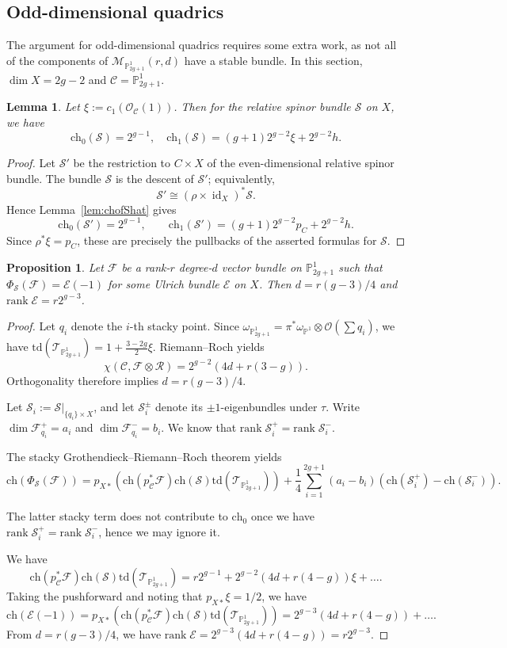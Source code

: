 \documentclass[12pt, letterpaper]{amsart}
\newtheorem{proposition}[theorem]{Proposition}
\newtheorem{lemma}[theorem]{Lemma}
\theoremstyle{definition}
\newcommand{\PP}{\mathbb{P} }
\newcommand{\cC}{\mathcal{C} }
\newcommand{\cE}{\mathcal{E} }
\newcommand{\cF}{\mathcal{F} }
\newcommand{\cM}{\mathcal{M} }
\newcommand{\cO}{\mathcal{O} }
\newcommand{\cR}{\mathcal{R} }
\newcommand{\cS}{\mathcal{S} }
\newcommand{\cT}{\mathcal{T} }
\def\rank{\mathrm{rank}\;}
\def\ch{\mathrm{ch}}
\def\td{\mathrm{td}}
\begin{document}
\subsection{Odd-dimensional quadrics}

The argument for odd-dimensional quadrics requires some extra work, as not all of the components of \(\cM_{\PP_{2g+1}^1}(r, d)\) have a stable bundle. In this section, \(\dim X = 2g - 2\) and \(\cC = \PP_{2g+1}^1\).

\begin{lemma}\label{lem:chofS}
Let \(\xi:=c_1(\cO_{\cC}(1))\). Then for the relative spinor bundle \(\cS\) on \(X\), we have
\[\ch_0(\cS) = 2^{g-1}, \quad \ch_1(\cS) = (g+1)2^{g-2}\xi + 2^{g-2}h.\]
\end{lemma}

\begin{proof}
Let \(\cS'\) be the restriction to \(C\times X\) of the even-dimensional relative spinor bundle. The bundle \(\cS\) is the descent of \(\cS'\); equivalently,
\[\cS'\cong(\rho\times\operatorname{id}_X)^*\cS.\]
Hence Lemma~\ref{lem:chofShat} gives
\[\ch_0(\cS')=2^{g-1},\qquad\ch_1(\cS')=(g+1)2^{g-2}p_C+2^{g-2}h.\]
Since \(\rho^*\xi=p_C\), these are precisely the pullbacks of the asserted formulas for \(\cS\).
\end{proof}

\begin{proposition}\label{prop:Ulrichrankodd}
Let \(\cF\) be a rank-\(r\) degree-\(d\) vector bundle on \(\PP_{2g+1}^1\) such that \(\Phi_{\cS}(\cF) = \cE(-1)\) for some Ulrich bundle \(\cE\) on \(X\). Then \(d = r(g-3)/4\) and \(\rank \cE = r2^{g-3}\).
\end{proposition}

\begin{proof}
Let \(q_i\) denote the \(i\)-th stacky point. Since \(\omega_{\PP_{2g+1}^1} = \pi^*\omega_{\PP^1} \otimes \cO(\sum q_i)\), we have \(\td(\cT_{\PP_{2g+1}^1}) = 1 + \frac{3-2g}{2}\xi\). Riemann--Roch yields
\[\chi(\cC, \cF \otimes \cR) = 2^{g-2}(4d + r(3-g)).\]
Orthogonality therefore implies \(d = r(g-3)/4\).

Let \(\cS_i:=\cS|_{\{q_i\}\times X}\), and let \(\cS_i^\pm\) denote its \(\pm1\)-eigenbundles under \(\tau\). Write \(\dim\cF_{q_i}^+=a_i\) and \(\dim\cF_{q_i}^-=b_i\). We know that \(\rank \cS_i^+ = \rank \cS_i^-\).

The stacky Grothendieck--Riemann--Roch theorem yields
\[\ch(\Phi_{\cS}(\cF))=p_{X*}(\ch(p_{\cC}^*\cF)\ch(\cS)\td(\cT_{\PP_{2g+1}^1}))+\frac14\sum_{i=1}^{2g+1}(a_i - b_i)(\ch(\cS_i^+)-\ch(\cS_i^-)).\]

The latter stacky term does not contribute to \(\ch_0\) once we have \(\rank \cS_i^+ = \rank \cS_i^-\), hence we may ignore it.

We have
\[\ch(p_{\cC}^*\cF)\ch(\cS)\td(\cT_{\PP_{2g+1}^1})=r2^{g-1} + 2^{g-2}(4d+r(4-g))\xi + \dots.\]
Taking the pushforward and noting that \(p_{X*}\xi = 1/2\), we have
\[\ch(\cE(-1)) = p_{X*}(\ch(p_{\cC}^*\cF)\ch(\cS)\td(\cT_{\PP_{2g+1}^1})) = 2^{g-3}(4d+r(4-g)) + \dots.\]
From \(d = r(g-3)/4\), we have \(\rank \cE = 2^{g-3}(4d + r(4-g)) = r2^{g-3}\).
\end{proof}
\end{document}
